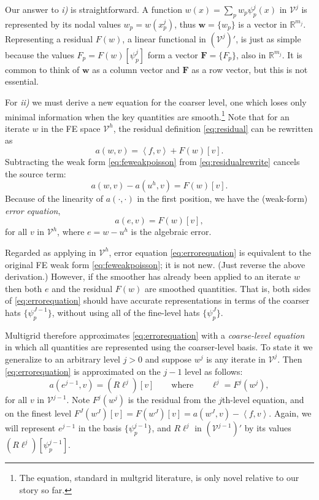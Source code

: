 \documentclass[letterpaper,final,12pt,reqno]{amsart}
\theoremstyle{claim}
\newcommand{\RR}{\mathbb{R}}
\newcommand{\bw}{\mathbf{w}}
\newcommand{\bF}{\mathbf{F}}
\newcommand{\ip}[2]{\left<#1,#2\right>}
\numberwithin{equation}{section}
\numberwithin{figure}{section}
\numberwithin{table}{section}
\numberwithin{theorem}{section}
\begin{document}
Our answer to \emph{i)} is straightforward.  A function $w(x) = \sum_p w_p \psi_p^j(x)$ in $\mathcal{V}^j$ is represented by its nodal values $w_p=w(x_p^j)$, thus $\bw = \{w_p\}$ is a vector in $\RR^{m_j}$.  Representing a residual $F(w)$, a linear functional in $(\mathcal{V}^j)'$, is just as simple because the values $F_p = F(w)[\psi_p^j]$ form a vector $\bF=\{F_p\}$, also in $\RR^{m_j}$.  It is common to think of $\bw$ as a column vector and $\bF$ as a row vector, but this is not essential.

For \emph{ii)} we must derive a new equation for the coarser level, one which loses only minimal information when the key quantities are smooth.\footnote{The equation, standard in multgrid literature, is only novel relative to our story so far.}  Note that for an iterate $w$ in the FE space $\mathcal{V}^h$, the residual definition \eqref{eq:residual} can be rewritten as
\begin{equation}
  a(w,v) = \ip{f}{v} + F(w)[v].  \label{eq:residualrewrite}
\end{equation}
Subtracting the weak form \eqref{eq:feweakpoisson} from \eqref{eq:residualrewrite} cancels the source term:
\begin{equation}
  a(w,v) - a(u^h,v) = F(w)[v].  \label{eq:errorequationearly}
\end{equation}
Because of the linearity of $a(\cdot,\cdot)$ in the first position, we have the (weak-form) \emph{error equation},
\begin{equation}
  a(e,v) = F(w)[v],  \label{eq:errorequation}
\end{equation}
for all $v$ in $\mathcal{V}^h$, where $e=w-u^h$ is the algebraic error.

Regarded as applying in $\mathcal{V}^h$, error equation \eqref{eq:errorequation} is equivalent to the original FE weak form \eqref{eq:feweakpoisson}; it is not new.  (Just reverse the above derivation.)  However, if the smoother has already been applied to an iterate $w$ then both $e$ and the residual $F(w)$ are smoothed quantities.  That is, both sides of \eqref{eq:errorequation} should have accurate representations in terms of the coarser hats $\{\psi_p^{J-1}\}$, without using all of the fine-level hats $\{\psi_p^{J}\}$.

Multigrid therefore approximates \eqref{eq:errorequation} with a \emph{coarse-level equation} in which all quantities are represented using the coarser-level basis.  To state it we generalize to an arbitrary level $j>0$ and suppose $w^j$ is any iterate in $\mathcal{V}^j$.  Then \eqref{eq:errorequation} is approximated on the $j-1$ level as follows:
\begin{equation}
  a(e^{j-1},v) = (R\ell^j)[v] \qquad \text{where} \qquad \ell^j = F^j(w^j),  \label{eq:coarsecorrection}
\end{equation}
for all $v$ in $\mathcal{V}^{j-1}$.  Note $F^j(w^j)$ is the residual from the $j$th-level equation, and on the finest level $F^J(w^J)[v] = F(w^J)[v] = a(w^J,v) - \ip{f}{v}$.  Again, we will represent $e^{j-1}$ in the basis $\{\psi_p^{j-1}\}$, and $R\ell^j$  in $(\mathcal{V}^{j-1})'$ by its values $(R\ell^j)[\psi_p^{j-1}]$.
\end{document}
